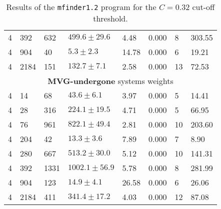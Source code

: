 \documentclass[a4paper,12pt]{article}
\begin{document}
\begin{table}[h!]
\begin{center}
\begin{tabular}{||p{1cm} | p{1cm} | p{1cm} | p{2.5cm} | p{1.5cm} | p{1.5cm} | p{1cm} | p{1.5cm}||}
			4 & 392  &  632  & $   499.6\pm29.6 $ & 4.48 &  0.000 &  8  & 303.55  \\
			4 & 904  &  40   & $  5.3\pm2.3     $ & 14.78 &  0.000 &  6  & 19.21   \\
			4 & 2184 &   151 & $    132.7\pm7.1 $ & 2.58 &  0.000 &  13 &  72.53  \\
			\hline \hline
			\multicolumn{8}{c}{\textbf{MVG-undergone} systems weights} \\
			\hline
			4 & 14   & 68    & $ 43.6\pm6.1       $ & 3.97  & 0.000 & 5  & 14.41   \\
			4 & 28   & 316   & $  224.1\pm19.5    $ & 4.71  & 0.000 & 5  & 66.95   \\
			4 & 76   & 961   & $  822.1\pm49.4    $ & 2.81  & 0.000 & 10 &  203.60 \\
			4 & 204  &  42   & $  13.3\pm3.6      $ & 7.89  & 0.000 & 7  & 8.90    \\
			4 & 280  &  667  & $   513.2\pm30.0   $ & 5.12  & 0.000 & 10 &  141.31 \\
			4 & 392  &  1331 & $    1002.1\pm56.9 $ & 5.78  & 0.000 & 8  & 281.99  \\
			4 & 904  &  123  & $   14.9\pm4.1     $ & 26.58 & 0.000 & 6  & 26.06   \\
			4 & 2184 &   411 & $    341.4\pm17.2  $ & 4.03  & 0.000 & 12 &  87.08  \\
			\hline
		\end{tabular}
	\end{center}
	\caption{Results of the \texttt{mfinder1.2} program for the $C = 0.32$ cut-off threshold.}
\end{table}
\end{document}
